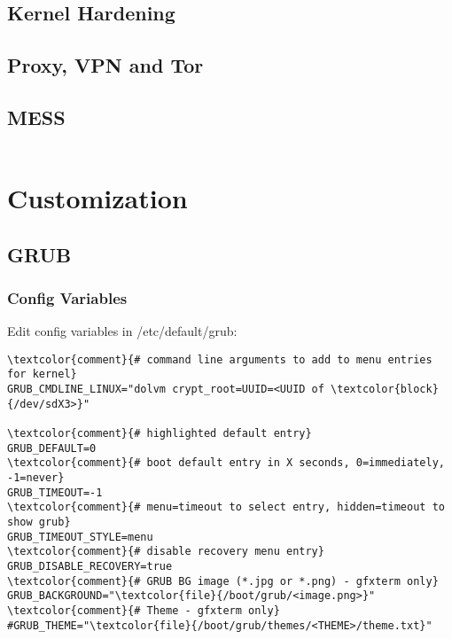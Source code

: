 \documentclass[10pt, a4paper, onecolumn, openany]{book}         %
\begin{document}
\section{Kernel Hardening}

\section{Proxy, VPN and Tor}

\section{MESS}
\begin{Verbatim}[commandchars=\\\{\}]

\end{Verbatim}






\chapter{Customization}
\label{grub.conf}
\section{GRUB}
\subsection{Config Variables}
Edit config variables in \textcolor{file}{/etc/default/grub}:
\begin{Verbatim}[commandchars=\\\{\}]
\textcolor{comment}{# command line arguments to add to menu entries for kernel}
GRUB_CMDLINE_LINUX="dolvm crypt_root=UUID=<UUID of \textcolor{block}{/dev/sdX3>}"

\textcolor{comment}{# highlighted default entry}
GRUB_DEFAULT=0
\textcolor{comment}{# boot default entry in X seconds, 0=immediately, -1=never}
GRUB_TIMEOUT=-1
\textcolor{comment}{# menu=timeout to select entry, hidden=timeout to show grub}
GRUB_TIMEOUT_STYLE=menu
\textcolor{comment}{# disable recovery menu entry}
GRUB_DISABLE_RECOVERY=true
\textcolor{comment}{# GRUB BG image (*.jpg or *.png) - gfxterm only}
GRUB_BACKGROUND="\textcolor{file}{/boot/grub/<image.png>}"
\textcolor{comment}{# Theme - gfxterm only}
#GRUB_THEME="\textcolor{file}{/boot/grub/themes/<THEME>/theme.txt}"
\end{Verbatim}
\end{document}
